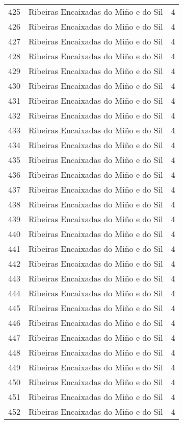 \begin{table}[p]
\begin{tabular}{rlr}
  425 & Ribeiras Encaixadas do Miño e do Sil &   4 \\ 
  426 & Ribeiras Encaixadas do Miño e do Sil &   4 \\ 
  427 & Ribeiras Encaixadas do Miño e do Sil &   4 \\ 
  428 & Ribeiras Encaixadas do Miño e do Sil &   4 \\ 
  429 & Ribeiras Encaixadas do Miño e do Sil &   4 \\ 
  430 & Ribeiras Encaixadas do Miño e do Sil &   4 \\ 
  431 & Ribeiras Encaixadas do Miño e do Sil &   4 \\ 
  432 & Ribeiras Encaixadas do Miño e do Sil &   4 \\ 
  433 & Ribeiras Encaixadas do Miño e do Sil &   4 \\ 
  434 & Ribeiras Encaixadas do Miño e do Sil &   4 \\ 
  435 & Ribeiras Encaixadas do Miño e do Sil &   4 \\ 
  436 & Ribeiras Encaixadas do Miño e do Sil &   4 \\ 
  437 & Ribeiras Encaixadas do Miño e do Sil &   4 \\ 
  438 & Ribeiras Encaixadas do Miño e do Sil &   4 \\ 
  439 & Ribeiras Encaixadas do Miño e do Sil &   4 \\ 
  440 & Ribeiras Encaixadas do Miño e do Sil &   4 \\ 
  441 & Ribeiras Encaixadas do Miño e do Sil &   4 \\ 
  442 & Ribeiras Encaixadas do Miño e do Sil &   4 \\ 
  443 & Ribeiras Encaixadas do Miño e do Sil &   4 \\ 
  444 & Ribeiras Encaixadas do Miño e do Sil &   4 \\ 
  445 & Ribeiras Encaixadas do Miño e do Sil &   4 \\ 
  446 & Ribeiras Encaixadas do Miño e do Sil &   4 \\ 
  447 & Ribeiras Encaixadas do Miño e do Sil &   4 \\ 
  448 & Ribeiras Encaixadas do Miño e do Sil &   4 \\ 
  449 & Ribeiras Encaixadas do Miño e do Sil &   4 \\ 
  450 & Ribeiras Encaixadas do Miño e do Sil &   4 \\ 
  451 & Ribeiras Encaixadas do Miño e do Sil &   4 \\ 
  452 & Ribeiras Encaixadas do Miño e do Sil &   4 \\ 

\end{tabular}
\end{table}

